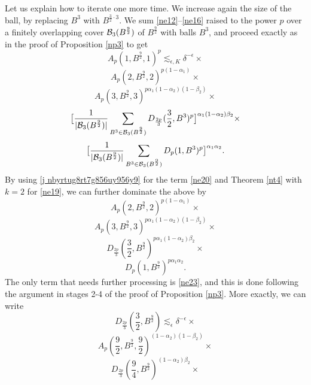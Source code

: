 \documentclass[amssymb,amsfonts,12pt]{amsart}
\begin{document}
Let us explain how to iterate one more time. We increase again the size of the ball, by replacing $B^3$ with $B^{\frac32\cdot3}$. We sum \eqref{ne12}--\eqref{ne16} raised to the power $p$ over a finitely overlapping cover ${\mathcal B}_3(B^{\frac92})$ of $B^{\frac92}$ with balls $B^{3}$, and proceed exactly as in the proof of Proposition \ref{np3} to get
$$A_p(1,B^{\frac92},1)^p\lesssim_{\epsilon,K}\delta^{-\epsilon}\times$$
\begin{equation}\label{ne17}
A_p(2,B^{\frac92},2)^{p(1-\alpha_1)}\times\end{equation}\begin{equation}
\label{ne18} A_p(3,B^{\frac92},3)^{p\alpha_1(1-\alpha_2)(1-\beta_2)}\times\end{equation}\begin{equation}
\label{ne19}\big[\frac1{|{\mathcal B}_3(B^{\frac92})|}\sum_{B^3\in{\mathcal B}_3(B^{\frac92})}D_{\frac{2p}{3}}(\frac32,B^3)^p\big]^{\alpha_1(1-\alpha_2)\beta_2}\times\end{equation}\begin{equation}
\label{ne20}\big[\frac1{|{\mathcal B}_3(B^{\frac92})|}\sum_{B^3\in{\mathcal B}_3(B^{\frac92})}D_p(1,B^3)^p\big]^{\alpha_1\alpha_2}.
\end{equation}
By using \eqref{j nbyrtug8rt7g856uy956y9} for the term \eqref{ne20} and Theorem \ref{nt4} with $k=2$ for \eqref{ne19}, we can further  dominate the above by
\begin{equation}\label{ne21}
A_p(2,B^{\frac92},2)^{p(1-\alpha_1)}\times\end{equation}\begin{equation}
\label{ne22}A_p(3,B^{\frac92},3)^{p\alpha_1(1-\alpha_2)(1-\beta_2)}\times\end{equation}\begin{equation}
\label{ne23}D_{\frac{2p}{3}}(\frac32,B^{\frac92})^{p\alpha_1(1-\alpha_2)\beta_2}\times\end{equation}\begin{equation}
\label{ne24}D_p(1,B^{\frac92})^{p\alpha_1\alpha_2}.
\end{equation}
The only term that needs further processing is \eqref{ne23}, and this is done following the argument in stages 2-4 of the proof of Proposition \ref{np3}. More exactly, we can write
$$
D_{\frac{2p}{3}}(\frac32,B^{\frac92})\lesssim_{\epsilon}\delta^{-\epsilon}\times
$$
\begin{equation}
\label{ne25}
A_p(\frac92,B^{\frac92},\frac92)^{(1-\alpha_2)(1-\beta_2)}\times
\end{equation}\begin{equation}
\label{ne26}
D_{\frac{2p}{3}}(\frac94,B^{\frac92})^{(1-\alpha_2)\beta_2}\times
\end{equation}
\end{document}
